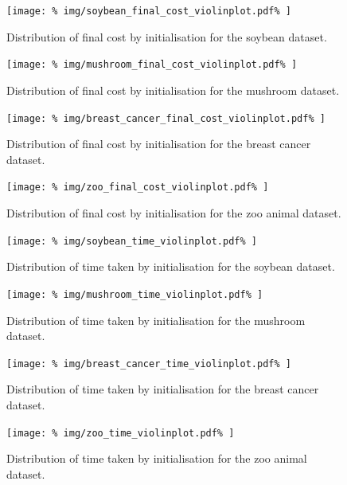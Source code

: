 \begin{figure}
    \centering
    \texttt{[image: \%
        img/soybean\_final\_cost\_violinplot.pdf\%
    ]}\caption{Distribution of final cost by initialisation for the soybean
              dataset.}
\end{figure}

\begin{figure}
    \centering
    \texttt{[image: \%
        img/mushroom\_final\_cost\_violinplot.pdf\%
    ]}\caption{Distribution of final cost by initialisation for the mushroom
              dataset.}
\end{figure}

\begin{figure}
    \centering
    \texttt{[image: \%
        img/breast\_cancer\_final\_cost\_violinplot.pdf\%
    ]}\caption{Distribution of final cost by initialisation for the breast
              cancer dataset.}
\end{figure}

\begin{figure}
    \centering
    \texttt{[image: \%
        img/zoo\_final\_cost\_violinplot.pdf\%
    ]}\caption{Distribution of final cost by initialisation for the zoo animal
              dataset.}
\end{figure}


\begin{figure}
    \centering
    \texttt{[image: \%
        img/soybean\_time\_violinplot.pdf\%
    ]}\caption{Distribution of time taken by initialisation for the soybean
              dataset.}
\end{figure}

\begin{figure}
    \centering
    \texttt{[image: \%
        img/mushroom\_time\_violinplot.pdf\%
    ]}\caption{Distribution of time taken by initialisation for the mushroom
              dataset.}
\end{figure}

\begin{figure}
    \centering
    \texttt{[image: \%
        img/breast\_cancer\_time\_violinplot.pdf\%
    ]}\caption{Distribution of time taken by initialisation for the breast
              cancer dataset.}
\end{figure}

\begin{figure}
    \centering
    \texttt{[image: \%
        img/zoo\_time\_violinplot.pdf\%
    ]}\caption{Distribution of time taken by initialisation for the zoo animal
              dataset.}
\end{figure}
